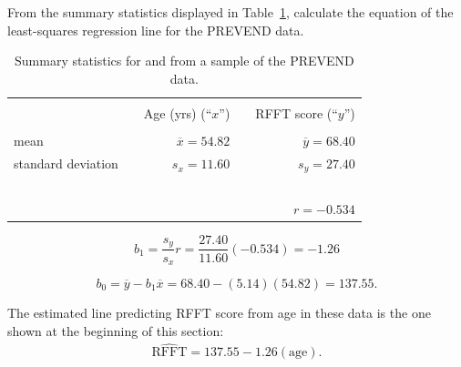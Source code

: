\begin{example}{From the summary statistics displayed in Table~\ref{summaryAgeRFFT}, calculate the equation of the least-squares regression line for the PREVEND data.
		
\begin{table}[ht]
	\centering
	\begin{tabular}{l rr}
		\hline
		\vspace{-4mm} & & \\
		\vspace{0.4mm}	&	\ \ Age (yrs) (``$x$'')	& \ \ RFFT score (``$y$'') \\
		\hline
		\vspace{-3.9mm} & & \\
		mean	& $\overline{x} = 54.82$		& $\overline{y} = 68.40$ \\
		standard deviation		& $s_x = 11.60$		& $s_y = 27.40$\vspace{0.4mm} \\
		\hline
		\vspace{-4mm}\ &\\
		& \multicolumn{2}{r}{$r=-0.534$} \\
		\hline
	\end{tabular}
	\caption{Summary statistics for  and  from a sample of the PREVEND data.}
	\label{summaryAgeRFFT}
\end{table}
}
	
\[b_1 = \frac{s_y}{s_x} r = \frac{27.40}{11.60}(-0.534) = -1.26\]

\[b_0 = \overline{y} - b_1\overline{x} = 68.40 - (5.14)(54.82) = 137.55. \]

The estimated line predicting RFFT score from age in these data is the one shown at the beginning of this section:
\begin{eqnarray*}
	\widehat{\text{RFFT}} = 137.55 - 1.26(\text{age}).
\end{eqnarray*}
	
\end{example}


